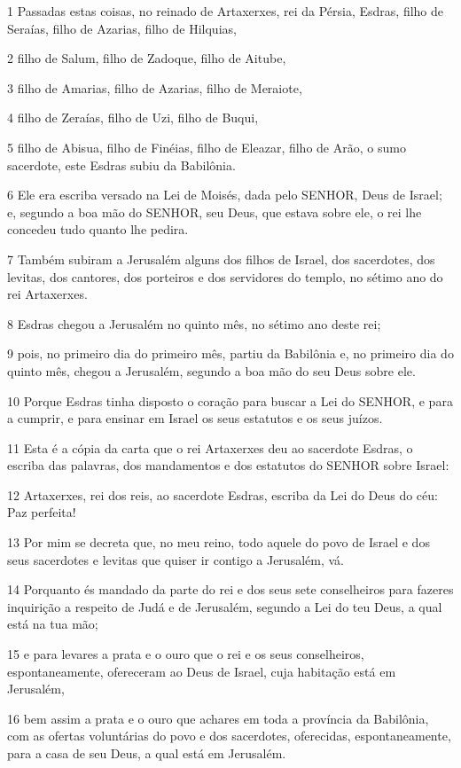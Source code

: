 \par 1 Passadas estas coisas, no reinado de Artaxerxes, rei da Pérsia, Esdras, filho de Seraías, filho de Azarias, filho de Hilquias,
\par 2 filho de Salum, filho de Zadoque, filho de Aitube,
\par 3 filho de Amarias, filho de Azarias, filho de Meraiote,
\par 4 filho de Zeraías, filho de Uzi, filho de Buqui,
\par 5 filho de Abisua, filho de Finéias, filho de Eleazar, filho de Arão, o sumo sacerdote, este Esdras subiu da Babilônia.
\par 6 Ele era escriba versado na Lei de Moisés, dada pelo SENHOR, Deus de Israel; e, segundo a boa mão do SENHOR, seu Deus, que estava sobre ele, o rei lhe concedeu tudo quanto lhe pedira.
\par 7 Também subiram a Jerusalém alguns dos filhos de Israel, dos sacerdotes, dos levitas, dos cantores, dos porteiros e dos servidores do templo, no sétimo ano do rei Artaxerxes.
\par 8 Esdras chegou a Jerusalém no quinto mês, no sétimo ano deste rei;
\par 9 pois, no primeiro dia do primeiro mês, partiu da Babilônia e, no primeiro dia do quinto mês, chegou a Jerusalém, segundo a boa mão do seu Deus sobre ele.
\par 10 Porque Esdras tinha disposto o coração para buscar a Lei do SENHOR, e para a cumprir, e para ensinar em Israel os seus estatutos e os seus juízos.
\par 11 Esta é a cópia da carta que o rei Artaxerxes deu ao sacerdote Esdras, o escriba das palavras, dos mandamentos e dos estatutos do SENHOR sobre Israel:
\par 12 Artaxerxes, rei dos reis, ao sacerdote Esdras, escriba da Lei do Deus do céu: Paz perfeita!
\par 13 Por mim se decreta que, no meu reino, todo aquele do povo de Israel e dos seus sacerdotes e levitas que quiser ir contigo a Jerusalém, vá.
\par 14 Porquanto és mandado da parte do rei e dos seus sete conselheiros para fazeres inquirição a respeito de Judá e de Jerusalém, segundo a Lei do teu Deus, a qual está na tua mão;
\par 15 e para levares a prata e o ouro que o rei e os seus conselheiros, espontaneamente, ofereceram ao Deus de Israel, cuja habitação está em Jerusalém,
\par 16 bem assim a prata e o ouro que achares em toda a província da Babilônia, com as ofertas voluntárias do povo e dos sacerdotes, oferecidas, espontaneamente, para a casa de seu Deus, a qual está em Jerusalém.
